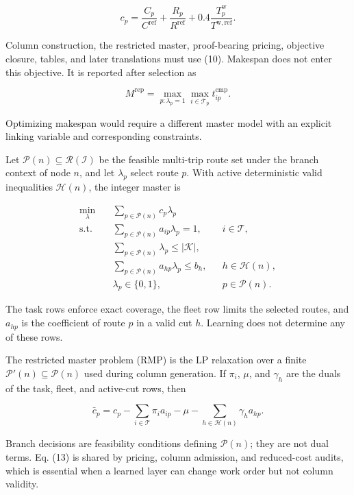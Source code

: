 \documentclass[
  11pt,
]{article}
\begin{document}
\[
c_p=
\frac{C_p}{C^{\mathrm{ref}}}
+\frac{R_p}{R^{\mathrm{ref}}}
+0.4\frac{T_p^{\mathrm{w}}}{T^{\mathrm{w},\mathrm{ref}}}.
\tag{10}
\]

Column construction, the restricted master, proof-bearing pricing,
objective closure, tables, and later translations must use (10).
Makespan does not enter this objective. It is reported after selection
as

\[
M^{\mathrm{rep}}
=\max_{p:\lambda_p=1}\max_{i\in\mathcal{T}_p}t_{ip}^{\mathrm{cmp}}.
\tag{11}
\]

Optimizing makespan would require a different master model with an
explicit linking variable and corresponding constraints.

Let \(\mathcal{P}(n)\subseteq\mathcal{R}(\mathcal{I})\) be the feasible
multi-trip route set under the branch context of node \(n\), and let
\(\lambda_p\) select route \(p\). With active deterministic valid
inequalities \(\mathcal{H}(n)\), the integer master is

\[
\begin{aligned}
\min_{\lambda}\quad&
\sum_{p\in\mathcal{P}(n)}c_p\lambda_p\\
\mathrm{s.t.}\quad&
\sum_{p\in\mathcal{P}(n)}a_{ip}\lambda_p=1,
&&i\in\mathcal{T},\\
&
\sum_{p\in\mathcal{P}(n)}\lambda_p\le|\mathcal{K}|,\\
&
\sum_{p\in\mathcal{P}(n)}a_{hp}\lambda_p\le b_h,
&&h\in\mathcal{H}(n),\\
&
\lambda_p\in\{0,1\},
&&p\in\mathcal{P}(n).
\end{aligned}
\tag{12}
\]

The task rows enforce exact coverage, the fleet row limits the selected
routes, and \(a_{hp}\) is the coefficient of route \(p\) in a valid cut
\(h\). Learning does not determine any of these rows.

The restricted master problem (RMP) is the LP relaxation over a finite
\(\mathcal{P}'(n)\subseteq\mathcal{P}(n)\) used during column
generation. If \(\pi_i\), \(\mu\), and \(\gamma_h\) are the duals of the
task, fleet, and active-cut rows, then

\[
\bar c_p=
c_p-\sum_{i\in\mathcal{T}}\pi_i a_{ip}
-\mu-\sum_{h\in\mathcal{H}(n)}\gamma_h a_{hp}.
\tag{13}
\]

Branch decisions are feasibility conditions defining \(\mathcal{P}(n)\);
they are not dual terms. Eq. (13) is shared by pricing, column
admission, and reduced-cost audits, which is essential when a learned
layer can change work order but not column validity.
\end{document}
